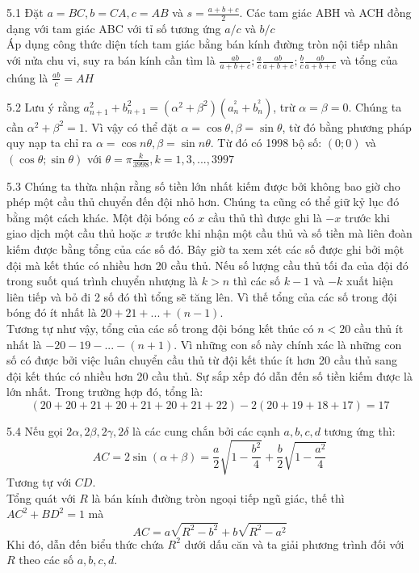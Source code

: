\begin{Answer}{5.1}
Đặt $a=BC, b=CA, c=AB$ và $s = \frac{{a + b + c}}{2}$. Các tam giác ABH và ACH đồng dạng với tam giác ABC với tỉ số tương ứng $a/c$ và $b/c$\\
Áp dụng công thức diện tích tam giác bằng bán kính đường tròn nội tiếp nhân với nửa chu vi, suy ra bán kính cần tìm là $\frac{{ab}}{{a + b + c}};\frac{a}{c}\frac{{ab}}{{a + b + c}};\frac{b}{c}\frac{{ab}}{{a + b + c}}$ và tổng của chúng là $\frac{{ab}}{c} = AH$
\end{Answer}
\begin{Answer}{5.2}
Lưu ý rằng $a_{n + 1}^2  + b_{n + 1}^2  = \left( {\alpha ^2  + \beta ^2 } \right)\left( {a_n^{^2 }  + b_n^{^2 } } \right)$, trừ $\alpha  = \beta  = 0$. Chúng ta cần $\alpha ^2  + \beta ^2  = 1$. Vì vậy có thể đặt $\alpha  = \cos \theta ,\beta  = \sin \theta $, từ đó bằng phương pháp quy nạp ta chỉ ra $\alpha  = \cos n \theta ,\beta  = \sin n \theta $. Từ đó có 1998 bộ số: $\left( {0;0} \right)$ và $\left( {\cos \theta ;\sin \theta } \right)$ với $\theta  = \pi \frac{k}{{3998}},k = 1,3,...,3997$
\end{Answer}
\begin{Answer}{5.3}
Chúng ta thừa nhận rằng số tiền lớn nhất kiếm được bởi không bao giờ cho phép một cầu thủ chuyển đến đội nhỏ hơn. Chúng ta cũng có thể giữ kỷ lục đó bằng một cách khác. Một đội bóng có $x$ cầu thủ thì được ghi là $-x$ trước khi giao dịch một cầu thủ hoặc $x$ trước khi nhận một cầu thủ và số tiền mà liên đoàn kiếm được bằng tổng của các số đó. Bây giờ ta xem xét các số được ghi bởi một đội  mà kết thúc có nhiều hơn 20 cầu thủ. Nếu số lượng cầu thủ tối đa của đội đó trong suốt quá trình chuyển nhượng là $k>n$  thì các số $k-1$ và $-k$ xuất hiện liên tiếp và bỏ đi 2 số đó thì tổng sẽ tăng lên. Vì thế tổng của các số trong đội bóng đó ít nhất là $20+21+...+(n-1)$.\\
Tương tự như vậy, tổng của các số trong đội bóng kết thúc có $n<20$ cầu thủ ít nhất là $-20-19-...-(n+1)$. Vì những con số này chính xác là những con số có được bởi việc luân chuyển cầu thủ từ đội kết thúc ít hơn 20 cầu thủ sang đội kết thúc có nhiều hơn 20 cầu thủ. Sự sắp xếp đó dẫn đến số tiền kiếm được là lớn nhất. Trong trường hợp đó, tổng là:
$$ (20+20+21+20+21+20+21+22) -2(20+19+18+17)=17$$
\end{Answer}
\begin{Answer}{5.4}
Nếu gọi $2\alpha ,2\beta ,2\gamma ,2\delta $ là các cung chắn bởi các cạnh $a,b,c,d$ tương ứng thì:
$$ AC = 2\sin \left( {\alpha  + \beta } \right) = \frac{a}{2}\sqrt {1 - \frac{{b^2 }}{4}}  + \frac{b}{2}\sqrt {1 - \frac{{a^2 }}{4}} $$
Tương tự với $CD$.\\
Tổng quát với $R$ là bán kính đường tròn ngoại tiếp ngũ giác, thế thì $AC^2+BD^2=1$ mà
$$  AC = a\sqrt {R^2  - b^2 }  + b\sqrt {R^2  - a^2 } $$
Khi đó, dẫn đến biểu thức chứa $R^2$ dưới dấu căn và ta giải phương trình đối với $R$ theo các số $a,b,c,d$.
\end{Answer}
